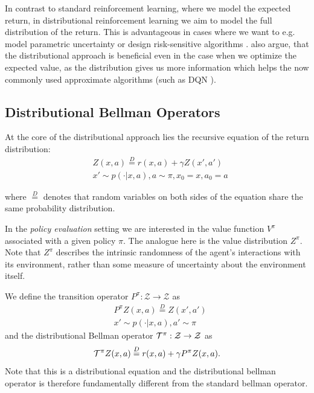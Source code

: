 In contrast to standard reinforcement learning, where we model the expected return, in distributional reinforcement learning we aim to model the full distribution of the return. This is advantageous in cases where we want to e.g. model parametric uncertainty or design risk-sensitive algorithms \citep{morimura2010nonparametric, morimura2012parametric}. \citet{bellemare2017distributional} also argue, that the distributional approach is beneficial even in the case when we optimize the expected value, as the distribution gives us more information which helps the now commonly used approximate algorithms (such as DQN \citep{mnih2015human}).

\subsection{Distributional Bellman Operators}

At the core of the distributional approach lies the recursive equation of the return distribution:
\begin{equation}
\begin{split}
&Z(x, a) \overset{D}{=} r(x, a) + \gamma Z(x', a')\\
&x' \sim p(\cdot|x, a), a \sim \pi, x_0 = x, a_0 = a
\end{split}
\end{equation}

where $\overset{D}{=}$ denotes that random variables on both sides of the equation share the same probability distribution.

In the \emph{policy evaluation} setting \citep{sutton1998reinforcement} we are interested in the value function $V^\pi$ associated with a given policy $\pi$. The analogue here is the value distribution $Z^\pi$. Note that $Z^\pi$ describes the intrinsic randomness of the agent's interactions with its environment, rather than some measure of uncertainty about the environment itself.
%

We define the transition operator $P^\pi : \mathcal{Z} \to \mathcal{Z}$ as
\begin{equation}\label{eqn:transitionop}
\begin{split}
&P^\pi Z(x, a) \overset{D}{=} Z(x', a')\\
&x' \sim p(\cdot|x, a), a' \sim \pi
\end{split}
\end{equation}
and the distributional Bellman operator $\mathcal{T}^\pi : \mathcal{Z} \to \mathcal{Z}$ as
\begin{equation}
\mathcal{T}^\pi Z(x,a) \overset{D}{=} r(x,a) + \gamma P^\pi Z(x,a).
\end{equation}
Note that this is a distributional equation and the distributional bellman operator is therefore fundamentally different from the standard bellman operator.

